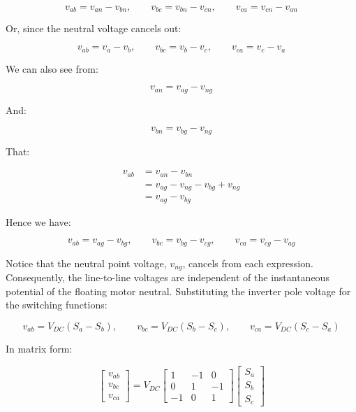 \documentclass{article}
\begin{document}
\begin{equation}
    v_{ab} = v_{an} - v_{bn}, \qquad
    v_{bc} = v_{bn} - v_{cn}, \qquad
    v_{ca} = v_{cn} - v_{an}
\end{equation}

Or, since the neutral voltage cancels out:

\begin{equation}
    v_{ab} = v_{a} - v_{b}, \qquad
    v_{bc} = v_{b} - v_{c}, \qquad
    v_{ca} = v_{c} - v_{a}
\end{equation}

We can also see from:

\begin{equation}
    v_{an} = v_{ag} - v_{ng}
\end{equation}

And:

\begin{equation}
    v_{bn} = v_{bg} - v_{ng}
\end{equation}

That:

\begin{align}
    v_{ab} &= v_{an} - v_{bn} \\
    &= v_{ag} - v_{ng} - v_{bg} + v_{ng} \\
    &= v_{ag} - v_{bg}
\end{align}

Hence we have:

\begin{equation}
    v_{ab} = v_{ag} - v_{bg}, \qquad
    v_{bc} = v_{bg} - v_{cg}, \qquad
    v_{ca} = v_{cg} - v_{ag}
\end{equation}

Notice that the neutral point voltage, $v_{ng}$, cancels from each expression. Consequently, the line-to-line voltages are independent of the instantaneous potential of the floating motor neutral. Substituting the inverter pole voltage for the switching functions:

\begin{equation}
    v_{ab} = V_{DC}(S_a - S_b), \qquad
    v_{bc} = V_{DC}(S_b - S_c), \qquad
    v_{ca} = V_{DC}(S_c - S_a)
\end{equation}

In matrix form:

\begin{equation}
    \begin{bmatrix}
        v_{ab} \\
        v_{bc} \\
        v_{ca}
    \end{bmatrix}
    = V_{DC}
    \begin{bmatrix}
        1 & -1 & 0 \\
        0 & 1 & -1 \\
        -1 & 0 & 1
    \end{bmatrix}
    \begin{bmatrix}
        S_a \\
        S_b \\
        S_c
    \end{bmatrix}
\end{equation}
\end{document}
